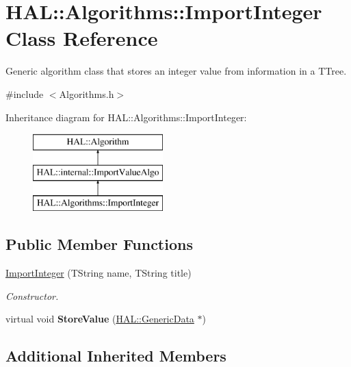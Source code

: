 \hypertarget{class_h_a_l_1_1_algorithms_1_1_import_integer}{\section{H\-A\-L\-:\-:Algorithms\-:\-:Import\-Integer Class Reference}
\label{class_h_a_l_1_1_algorithms_1_1_import_integer}
}


Generic algorithm class that stores an integer value from information in a T\-Tree.  




{\ttfamily \#include $<$Algorithms.\-h$>$}

Inheritance diagram for H\-A\-L\-:\-:Algorithms\-:\-:Import\-Integer\-:\begin{figure}[H]
\begin{center}
\leavevmode
\includegraphics[height=3.000000cm]{class_h_a_l_1_1_algorithms_1_1_import_integer}
\end{center}
\end{figure}
\subsection*{Public Member Functions}
\begin{DoxyCompactItemize}
\item 
\hyperlink{class_h_a_l_1_1_algorithms_1_1_import_integer_a9dbe511f3ff1a3bf1d9a0de66f08da34}{Import\-Integer} (T\-String name, T\-String title)
\begin{DoxyCompactList}\small\item\em Constructor. \end{DoxyCompactList}\item 
\hypertarget{class_h_a_l_1_1_algorithms_1_1_import_integer_a182865e798de3856a85e4339155b8a7f}{virtual void {\bfseries Store\-Value} (\hyperlink{class_h_a_l_1_1_generic_data}{H\-A\-L\-::\-Generic\-Data} $\ast$)}\label{class_h_a_l_1_1_algorithms_1_1_import_integer_a182865e798de3856a85e4339155b8a7f}

\end{DoxyCompactItemize}
\subsection*{Additional Inherited Members}


